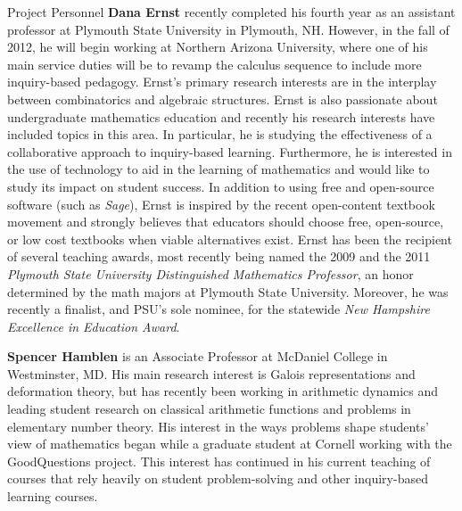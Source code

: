 \documentclass[11pt]{article}
\begin{document}
\begin{section}{Project Personnel}
\textbf{Dana Ernst} recently completed his fourth year as an assistant
professor at Plymouth State University in Plymouth, NH.  However, in the
fall of 2012, he will begin working at Northern Arizona University, where
one of his main service duties will be to revamp the calculus sequence to
include more inquiry-based pedagogy.  Ernst's primary research interests
are in the interplay between combinatorics and algebraic structures.
Ernst is also passionate about undergraduate mathematics education and
recently his research interests have included topics in this area. In
particular, he is studying the effectiveness of a collaborative approach
to inquiry-based learning.  Furthermore, he is interested in the use of
technology to aid in the learning of mathematics and would like to study
its impact on student success.  In addition to using free and open-source
software (such as \emph{Sage}), Ernst is inspired by the recent
open-content textbook movement and strongly believes that educators should
choose free, open-source, or low cost textbooks when viable alternatives
exist.  Ernst has been the recipient of several teaching awards, most
recently being named the 2009 and the 2011 \emph{Plymouth State University
Distinguished Mathematics Professor}, an honor determined by the math
majors at Plymouth State University.  Moreover, he was recently a
finalist, and PSU's sole nominee, for the statewide \emph{New Hampshire
Excellence in Education Award}.

\textbf{Spencer Hamblen} is an Associate Professor at McDaniel College in
Westminster, MD.  His main research interest is Galois representations and
deformation theory, but has recently been working in arithmetic dynamics
and leading student research on classical arithmetic functions and problems 
in elementary number theory.  His interest in the ways problems shape 
students' view of mathematics began while a graduate student at Cornell 
working with the GoodQuestions project.  This interest has continued in his 
current teaching of courses that rely heavily on student problem-solving 
and other inquiry-based learning courses.


\end{section}
\end{document}
